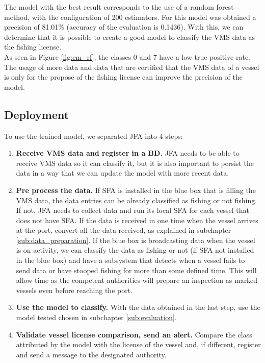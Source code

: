 \newpage


The model with the best result corresponds to the use of a random forest method, with the configuration of 200 estimators. For this model was obtained a precision of 81.01\% (accuracy of the evaluation is 0.1436).
With this, we can determine that it is possible to create a good model to classify the VMS data as the fishing license. \\
As seen in Figure \ref{fig:cm_rf}, the classes 0 and 7 have a low true positive rate. The usage of more data and data that are certified that the VMS data of a vessel is only for the propose of the fishing license can improve the precision of the model.





\subsection{Deployment} %
\label{sub:deployment}

To use the trained model, we separated JFA into 4 steps:
\begin{enumerate}
\item \textbf{ Receive VMS data and register in a BD.} JFA needs to be able to receive VMS data so it can classify it, but it is also important to persist the data in a way that we can update the model with more recent data. 

\item \textbf{Pre process the data.} If SFA is installed in the blue box that is filling the VMS data, the data entries can be already classified as fishing or not fishing. If not, JFA needs to collect data and run its local SFA for each vessel that does not have SFA. If the data is received in one time when the vessel arrives at the port, convert all the data received, as explained in subchapter \ref{sub:data_preparation}. If the blue box is broadcasting data when the vessel is on activity, we can classify the data as fishing or not (if SFA not installed in the blue box) and have a subsystem that detects when a vessel fails to send data or have stooped fishing for more than some defined time. This will allow time as the competent authorities will prepare an inspection as marked vessels even before reaching the port.

\item \textbf{Use the model to classify.} With the data obtained in the last step, use the model tested chosen in subchapter \ref{sub:evaluation}.

\item \textbf{Validate vessel license comparison, send an alert.} Compare the class attributed by the model with the license of the vessel and, if different, register and send a message to the designated authority.

\end{enumerate}

